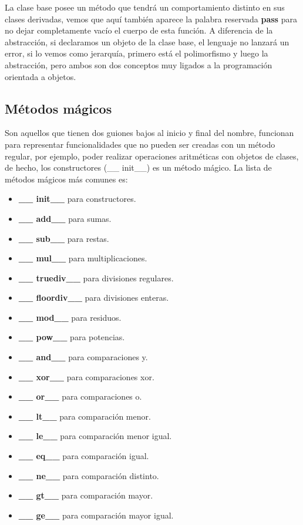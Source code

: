 La clase base posee un método que tendrá un comportamiento distinto en sus clases derivadas, vemos que aquí también aparece la palabra reservada \textbf{pass} para no dejar completamente vacío el cuerpo de esta función. A diferencia de la abstracción, si declaramos un objeto de la clase base, el lenguaje no lanzará un error, si lo vemos como jerarquía, primero está el polimorfismo y luego la abstracción, pero ambos son dos conceptos muy ligados a la programación orientada a objetos.


\subsection{Métodos mágicos}
\hspace{0.55cm}Son aquellos que tienen dos guiones bajos al inicio y final del nombre, funcionan para representar funcionalidades que no pueden ser creadas con un método regular, por ejemplo, poder realizar operaciones aritméticas con objetos de clases, de hecho, los constructores (\_\_ init\_\_) es un método mágico. La lista de métodos mágicos más comunes es:
\begin{itemize}
	\item \textbf{\_\_ init\_\_} para constructores.
	\item \textbf{\_\_ add\_\_} para sumas.
	\item \textbf{\_\_ sub\_\_} para restas.
	\item \textbf{\_\_ mul\_\_} para multiplicaciones.
	\item \textbf{\_\_ truediv\_\_} para divisiones regulares.
	\item \textbf{\_\_ floordiv\_\_} para divisiones enteras.
	\item \textbf{\_\_ mod\_\_} para residuos.
	\item \textbf{\_\_ pow\_\_} para potencias.
	\item \textbf{\_\_ and\_\_} para comparaciones y.
	\item \textbf{\_\_ xor\_\_} para comparaciones xor.
	\item \textbf{\_\_ or\_\_} para comparaciones o.
	\item \textbf{\_\_ lt\_\_} para comparación menor.
	\item \textbf{\_\_ le\_\_} para comparación menor igual.
	\item \textbf{\_\_ eq\_\_} para comparación igual.
	\item \textbf{\_\_ ne\_\_} para comparación distinto.
	\item \textbf{\_\_ gt\_\_} para comparación mayor.
	\item \textbf{\_\_ ge\_\_} para comparación mayor igual.
\end{itemize}


